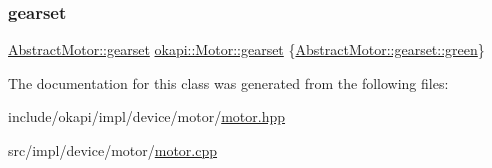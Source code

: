 \subsubsection{\texorpdfstring{gearset}{gearset}}
{\footnotesize\ttfamily \mbox{\hyperlink{classokapi_1_1AbstractMotor_a88aaa6ea2fa10f5520a537bbf26774d5}{Abstract\+Motor\+::gearset}} \mbox{\hyperlink{classokapi_1_1AbstractMotor_a88aaa6ea2fa10f5520a537bbf26774d5}{okapi\+::\+Motor\+::gearset}} \{\mbox{\hyperlink{classokapi_1_1AbstractMotor_a88aaa6ea2fa10f5520a537bbf26774d5a9f27410725ab8cc8854a2769c7a516b8}{Abstract\+Motor\+::gearset\+::green}}\}\hspace{0.3cm}{\ttfamily [protected]}}



The documentation for this class was generated from the following files\+:\begin{DoxyCompactItemize}
\item 
include/okapi/impl/device/motor/\mbox{\hyperlink{motor_8hpp}{motor.\+hpp}}\item 
src/impl/device/motor/\mbox{\hyperlink{motor_8cpp}{motor.\+cpp}}\end{DoxyCompactItemize}
